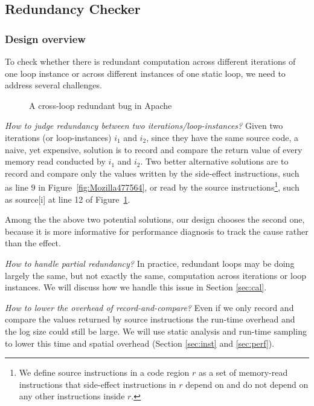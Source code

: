 \subsection{Redundancy Checker}
\label{sec:redundant}

\subsubsection{Design overview}
To check whether there is redundant computation across different iterations
of one loop instance or across different instances of one static loop, we need
to address several challenges.

\begin{figure}
  \centering
  \mbox{}
  \caption{A cross-loop redundant bug in Apache}
  \label{fig:Apache34464}
\end{figure}

\emph{How to judge redundancy between two iterations/loop-instances?}
Given two iterations (or loop-instances) $i_1$ and $i_2$, since they have 
the same source code, 
a naive, yet expensive, solution is to record and compare the return value of
every memory read conducted by $i_1$ and $i_2$. Two better alternative
solutions are to record and compare only the values written by the
side-effect instructions, such as 
line 9 in Figure~\ref{fig:Mozilla477564},
or read by 
the source instructions\footnote{We define source instructions in a code
region $r$ as a set of memory-read instructions that side-effect
instructions in $r$ depend on and do not depend on any other instructions
inside $r$.}, 
such as source[i] at line 12 of Figure~\ref{fig:Apache34464}.

Among the the above two potential solutions, our design chooses the second one,
because it is
more informative for performance diagnosis 
to track the cause rather than the effect.

\emph{How to handle partial redundancy?}
In practice, redundant loops may be doing largely the same, but not exactly
the same, computation across iterations or loop instances. 
We will discuss how we handle this issue in Section \ref{sec:cal}.



\emph{How to lower the overhead of record-and-compare?}
Even if we only record and compare the values returned by source instructions
the run-time overhead and the log size
could still be large. We will use static analysis and run-time sampling
to lower this time and spatial
overhead 
(Section \ref{sec:inst} and \ref{sec:perf}).


